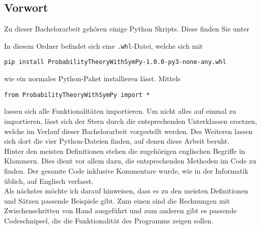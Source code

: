 \subsection*{Vorwort}

Zu dieser Bachelorarbeit gehören einige Python Skripts. Diese finden Sie unter
\begin{center}
\href{https://github.com/Blondai/Elementare-Wahrscheinlichkeitstheorie-mit-SymPy}{}
\end{center}
In diesem Ordner befindet sich eine \lstinline|.whl|-Datei, welche sich mit
\begin{lstlisting}
pip install ProbabilityTheoryWithSymPy-1.0.0-py3-none-any.whl
\end{lstlisting}
wie ein normales Python-Paket installieren lässt. Mittels
\begin{lstlisting}
from ProbabilityTheoryWithSymPy import *
\end{lstlisting}
lassen sich alle Funktionalitäten importieren. Um nicht alles auf einmal zu importieren, lässt sich der Stern  durch die entsprechenden Unterklassen ersetzen, welche im Verlauf dieser Bachelorarbeit vorgestellt werden. Des Weiteren lassen sich dort die vier Python-Dateien finden, auf denen diese Arbeit beruht.\\

Hinter den meisten Definitionen stehen die zugehörigen englischen Begriffe in Klammern. Dies dient vor allem dazu, die entsprechenden Methoden im Code zu finden. Der gesamte Code inklusive Kommentare wurde, wie in der Informatik üblich, auf Englisch verfasst.\\

Als nächstes möchte ich darauf hinweisen, dass es zu den meisten Definitionen und Sätzen passende Beispiele gibt. Zum einen sind die Rechnungen mit Zwischenschritten von Hand ausgeführt und zum anderen gibt es passende Codeschnipsel, die die Funktionalität des Programms zeigen sollen.\\

